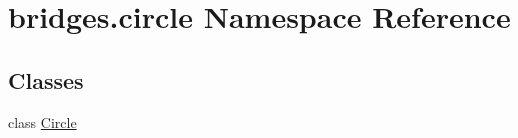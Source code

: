 \hypertarget{namespacebridges_1_1circle}{}\section{bridges.\+circle Namespace Reference}
\label{namespacebridges_1_1circle}
\subsection*{Classes}
\begin{DoxyCompactItemize}
\item 
class \mbox{\hyperlink{classbridges_1_1circle_1_1_circle}{Circle}}
\end{DoxyCompactItemize}

